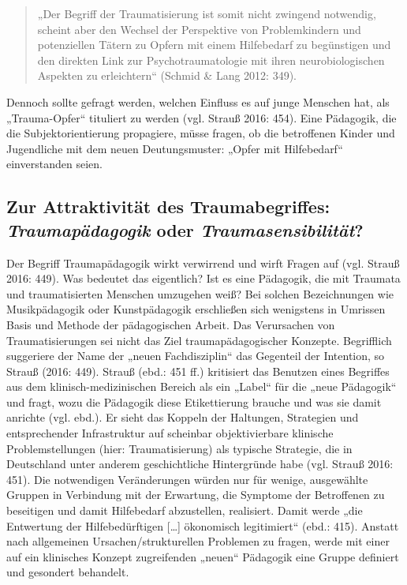 \begin{quote}
\small{„Der Begriff der Traumatisierung ist somit nicht zwingend notwendig, scheint aber den Wechsel der Perspektive von Problemkindern und potenziellen T{\"a}tern zu Opfern mit einem Hilfebedarf zu beg{\"u}nstigen und den direkten Link zur Psychotraumatologie mit ihren neurobiologischen Aspekten zu erleichtern“ (Schmid \& Lang 2012: 349).}
\end{quote}

Dennoch sollte gefragt werden, welchen Einfluss es auf junge Menschen hat, als „Trauma-Opfer“ tituliert zu werden (vgl. Strauß 2016: 454). Eine Pädagogik, die die Subjektorientierung propagiere, müsse fragen, ob die betroffenen Kinder und Jugendliche mit dem neuen Deutungsmuster: „Opfer mit Hilfebedarf“ einverstanden seien.

\subsection{Zur Attraktivität des Traumabegriffes: \textit{Traumap{\"a}dagogik} oder \textit{Traumasensibilität}?}
Der Begriff Traumapädagogik wirkt verwirrend und wirft Fragen auf (vgl. Strauß 2016: 449). Was bedeutet das eigentlich? Ist es eine Pädagogik, die mit Traumata und traumatisierten Menschen umzugehen weiß? Bei solchen Bezeichnungen wie Musikpädagogik oder Kunstpädagogik erschließen sich wenigstens in Umrissen Basis und Methode der pädagogischen Arbeit. Das Verursachen von Traumatisierungen sei nicht das Ziel traumapädagogischer Konzepte. Begrifflich suggeriere der Name der „neuen Fachdisziplin“ das Gegenteil der Intention, so Strauß (2016: 449). Strauß (ebd.: 451 ff.) kritisiert das Benutzen eines Begriffes aus dem klinisch-medizinischen Bereich als ein „Label“ für die „neue Pädagogik“ und fragt, wozu die Pädagogik diese Etikettierung brauche und was sie damit anrichte (vgl. ebd.). Er sieht das Koppeln der Haltungen, Strategien und entsprechender Infrastruktur auf scheinbar objektivierbare klinische Problemstellungen (hier: Traumatisierung) als typische Strategie, die in Deutschland unter anderem geschichtliche Hintergründe habe (vgl. Strauß 2016: 451). Die notwendigen Veränderungen würden nur für wenige, ausgewählte Gruppen in Verbindung mit der Erwartung, die Symptome der Betroffenen zu beseitigen und damit Hilfebedarf abzustellen, realisiert. Damit werde „die Entwertung der Hilfebedürftigen […] ökonomisch legitimiert“ (ebd.: 415). Anstatt nach allgemeinen Ursachen/strukturellen Problemen zu fragen, werde mit einer auf ein klinisches Konzept zugreifenden „neuen“ Pädagogik eine Gruppe definiert und gesondert behandelt.

